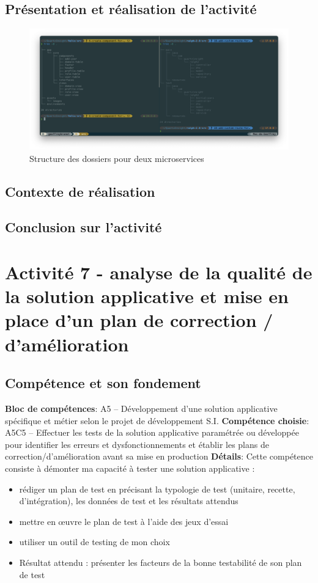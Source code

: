 \documentclass[a4paper, 11pt]{report}
\begin{document}
\subsection{Présentation et réalisation de l'activité}
  \begin{figure}[H]
      \centering
      \includegraphics[scale=0.35,center]{screenshots/directories.png}
      \caption{Structure des dossiers pour deux microservices}
  \end{figure}
\subsection{Contexte de réalisation}
\subsection{Conclusion sur l'activité}

\section{Activité 7 - analyse de la qualité de la solution applicative et mise en place d’un plan de correction / d’amélioration}
\subsection{Compétence et son fondement}
\textbf{Bloc de compétences}: A5 – Développement d’une solution applicative spécifique et métier selon le projet de développement S.I.
\newline
\textbf{Compétence choisie}: A5C5 – Effectuer les tests de la solution applicative paramétrée ou développée pour identifier les erreurs et dysfonctionnements et établir les plans de correction/d’amélioration avant sa mise en production
\newline
\textbf{Détails}: Cette compétence consiste à démonter ma capacité à tester une solution applicative :
\begin{itemize}
  \item rédiger un plan de test en précisant la typologie de test (unitaire, recette, d’intégration), les données de test et les résultats attendus
  \item mettre en œuvre le plan de test à l’aide des jeux d’essai
  \item utiliser un outil de testing de mon choix
  \item Résultat attendu : présenter les facteurs de la bonne testabilité de son plan de test
\end{itemize}
\end{document}

